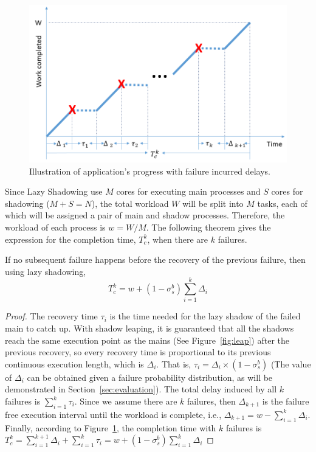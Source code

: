 \begin{figure}[!t]
	\begin{center}
		\includegraphics[width=\columnwidth]{Figures/progress}
	\end{center}
	\caption{Illustration of application's progress with failure incurred delays.}
	\label{fig:progress}
\end{figure}

Since Lazy Shadowing use $M$ cores for executing main processes and $S$ cores for shadowing ($M+S=N$), the total workload $W$ will be split into $M$ tasks, each of which will be assigned a pair of main and shadow processes. Therefore, the workload of each process is 
$w=W/M$. The following theorem gives the expression for the completion time, $T_c^k$, when there are $k$ failures.

\begin{theorem}
If no subsequent failure happens before the recovery of the previous failure, then using lazy shadowing, 
	$$T_c^k = w + (1-\sigma_s^b)\sum_{i=1}^k\Delta_i$$
\end{theorem}
\begin{proof}
The recovery time $\tau_i$ is the time needed for the lazy shadow of the failed main to catch up. With shadow leaping, it is guaranteed that all the shadows reach the same execution point as the mains (See Figure~\ref{fig:leap}) after the previous recovery, so every recovery time is proportional to its previous continuous execution length, which is $\Delta_i$. That is, $\tau_i = \Delta_i \times (1 - \sigma_s^b)$ (The value of $\Delta_i$ can be obtained given a failure probability distribution, as will be demonstrated in Section~\ref{sec:evaluation}). The total delay induced by all $k$ failures is $\sum_{i=1}^k\tau_i$.
Since we assume there are $k$ failures, then $\Delta_{k+1}$ is the failure free execution interval until the workload is complete, i.e., $\Delta_{k+1} = w - \sum_{i=1}^{k}\Delta_i$. Finally, according to Figure~\ref{fig:progress}, the completion time with $k$ failures is 
	$T_c^k = \sum_{i=1}^{k+1}\Delta_i + \sum_{i=1}^k\tau_i = w + (1-\sigma_s^b)\sum_{i=1}^k\Delta_i$
\end{proof}

